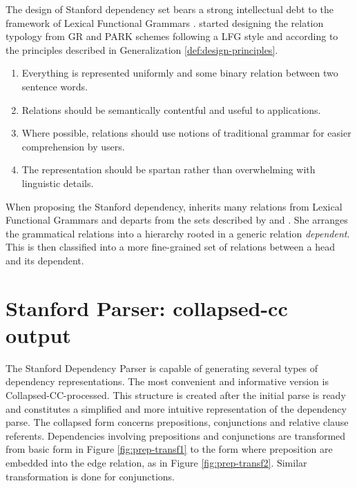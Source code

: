 The design of Stanford dependency set \citep{Marneffe2006, Marneffe2008,  Marneffe2014, Silveira2014} bears a strong intellectual debt to the framework of Lexical Functional Grammars \citep{Brensan2000}. \citet{Marneffe2006} started designing the relation typology from GR \citep{Carroll1999} and PARK \citep{King2003} schemes following a LFG style and according to the principles described in Generalization \ref{def:design-principles}.

\begin{generalization}\label{def:design-principles}\leavevmode
	\begin{enumerate}
		\item Everything is represented uniformly and some binary relation between two sentence words.
		\item Relations should be semantically contentful and useful to applications.
		\item Where possible, relations should use notions of traditional grammar \citep{Quirk1985} for easier comprehension by users.
		\item The representation should be spartan rather than overwhelming with linguistic details. 
	\end{enumerate}
\end{generalization}

When proposing the Stanford dependency, \citet{Marneffe2006} inherits many relations from Lexical Functional Grammars\citep{Brensan2000} and departs from the sets described by \citet{Carroll1999} and \citet{King2003}. She arranges the grammatical relations into a hierarchy rooted in a generic relation \textit{dependent}. This is then classified into a more fine-grained set of relations between a head and its dependent. 

\section{Stanford Parser: collapsed-cc output}
\label{sec:collapsed-cc-output}
The Stanford Dependency Parser is capable of generating several types of dependency representations. The most convenient and informative version is Collapsed-CC-processed. This structure is created after the initial parse is ready and constitutes a simplified and more intuitive representation of the dependency parse. The collapsed form concerns prepositions, conjunctions and relative clause referents. Dependencies involving prepositions and conjunctions are transformed from basic form in Figure \ref{fig:prep-transf1} to the form where preposition are embedded into the edge relation, as in Figure \ref{fig:prep-transf2}. Similar transformation is done for conjunctions. 

